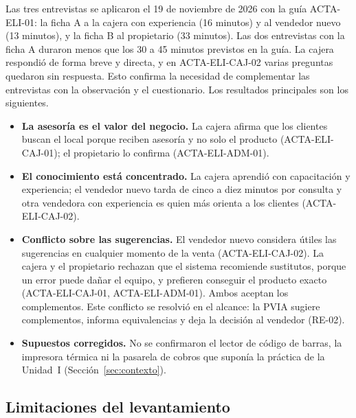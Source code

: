 Las tres entrevistas se aplicaron el 19 de noviembre de 2026 con la guía ACTA-ELI-01: la ficha A a la cajera con experiencia (16 minutos) y al vendedor nuevo (13 minutos), y la ficha B al propietario (33 minutos). Las dos entrevistas con la ficha A duraron menos que los 30 a 45 minutos previstos en la guía. La cajera respondió de forma breve y directa, y en ACTA-ELI-CAJ-02 varias preguntas quedaron sin respuesta. Esto confirma la necesidad de complementar las entrevistas con la observación y el cuestionario. Los resultados principales son los siguientes.

\begin{itemize}
\item \textbf{La asesoría es el valor del negocio.} La cajera afirma que los clientes buscan el local porque reciben asesoría y no solo el producto (ACTA-ELI-CAJ-01); el propietario lo confirma (ACTA-ELI-ADM-01).
\item \textbf{El conocimiento está concentrado.} La cajera aprendió con capacitación y experiencia; el vendedor nuevo tarda de cinco a diez minutos por consulta y otra vendedora con experiencia es quien más orienta a los clientes (ACTA-ELI-CAJ-02).
\item \textbf{Conflicto sobre las sugerencias.} El vendedor nuevo considera útiles las sugerencias en cualquier momento de la venta (ACTA-ELI-CAJ-02). La cajera y el propietario rechazan que el sistema recomiende sustitutos, porque un error puede dañar el equipo, y prefieren conseguir el producto exacto (ACTA-ELI-CAJ-01, ACTA-ELI-ADM-01). Ambos aceptan los complementos. Este conflicto se resolvió en el alcance: la PVIA sugiere complementos, informa equivalencias y deja la decisión al vendedor (RE-02).
\item \textbf{Supuestos corregidos.} No se confirmaron el lector de código de barras, la impresora térmica ni la pasarela de cobros que suponía la práctica de la Unidad~I (Sección~\ref{sec:contexto}).
\end{itemize}

\subsection{Limitaciones del levantamiento}

